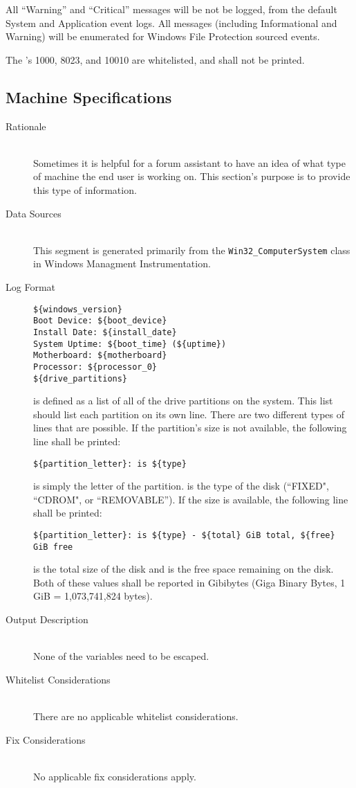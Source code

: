 All ``Warning'' and ``Critical'' messages will be not be logged, from the
default System and Application event logs. All messages (including Informational
and Warning) will be enumerated for Windows File Protection sourced events.

The 's 1000, 8023, and 10010 are whitelisted, and shall not be
printed.

\subsection{Machine Specifications}
\begin{description}
\item[Rationale] \hfill \\
Sometimes it is helpful for a forum assistant to have an idea of what type of
machine the end user is working on.  This section's purpose is to provide this
type of information.
\item[Data Sources] \hfill \\
This segment is generated primarily from the \verb|Win32_ComputerSystem| class
in Windows Managment Instrumentation.
\item[Log Format] \hfill 
\vspace{-\baselineskip}
\begin{verbatim}
${windows_version}
Boot Device: ${boot_device}
Install Date: ${install_date}
System Uptime: ${boot_time} (${uptime})
Motherboard: ${motherboard}
Processor: ${processor_0}
${drive_partitions}
\end{verbatim}
 is defined as a list of all of the drive partitions
on the system.  This list should list each partition on its own line.  There are
two different types of lines that are possible.  If the partition's size is not
available, the following line shall be printed:
\vspace{-\baselineskip}
\begin{verbatim}
${partition_letter}: is ${type}
\end{verbatim}
 is simply the letter of the partition.   is
the type of the disk (``FIXED", ``CDROM", or ``REMOVABLE'').  If the size is
available, the following line shall be printed:
\vspace{-\baselineskip}
\begin{verbatim}
${partition_letter}: is ${type} - ${total} GiB total, ${free} GiB free
\end{verbatim}
 is the total size of the disk and  is the free space
remaining on the disk.  Both of these values shall be reported in Gibibytes
(Giga Binary Bytes, 1 GiB = 1,073,741,824 bytes).

\item[Output Description] \hfill \\
None of the variables need to be escaped.
\item[Whitelist Considerations] \hfill \\
There are no applicable whitelist considerations.
\item[Fix Considerations] \hfill \\
No applicable fix considerations apply.  
\end{description}

